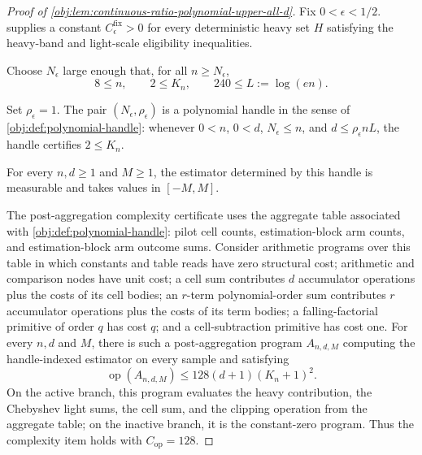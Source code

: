 \documentclass[11pt]{article}
\begin{document}
\begin{proof}[Proof of \cref{obj:lem:continuous-ratio-polynomial-upper-all-d}]
Fix \(0<\epsilon<1/2\).   supplies a constant \(C_{\epsilon}^{\mathrm{fix}}>0\) for every deterministic heavy set \(H\) satisfying the heavy-band and light-scale eligibility inequalities. %

Choose \(N_\epsilon\) large enough that, for all \(n\ge N_\epsilon\),
\[
8\le n,
\qquad
2\le K_n,
\qquad
240\le L:=\log(en).
\]

Set \(\rho_\epsilon=1\).  The pair \((N_\epsilon,\rho_\epsilon)\) is a polynomial handle in the sense of \cref{obj:def:polynomial-handle}: whenever \(0<n\), \(0<d\), \(N_\epsilon\le n\), and \(d\le \rho_\epsilon nL\), the handle certifies \(2\le K_n\). %

For every \(n,d\ge1\) and \(M\ge1\), the estimator determined by this handle is measurable and takes values in \([-M,M]\). %

The post-aggregation complexity certificate uses the aggregate table associated with \cref{obj:def:polynomial-handle}: pilot cell counts, estimation-block arm counts, and estimation-block arm outcome sums.  Consider arithmetic programs over this table in which constants and table reads have zero structural cost; arithmetic and comparison nodes have unit cost; a cell sum contributes \(d\) accumulator operations plus the costs of its cell bodies; an \(r\)-term polynomial-order sum contributes \(r\) accumulator operations plus the costs of its term bodies; a falling-factorial primitive of order \(q\) has cost \(q\); and a cell-subtraction primitive has cost one.  For every \(n,d\) and \(M\), there is such a post-aggregation program \(A_{n,d,M}\) computing the handle-indexed estimator on every sample and satisfying
\[
\operatorname{op}(A_{n,d,M})
\le
128(d+1)(K_n+1)^2.
\]
On the active branch, this program evaluates the heavy contribution, the Chebyshev light sums, the cell sum, and the clipping operation from the aggregate table; on the inactive branch, it is the constant-zero program.  Thus the complexity item holds with \(C_{\mathrm{op}}=128\). %


\end{proof}
\end{document}

